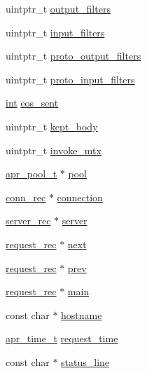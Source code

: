 \begin{DoxyCompactItemize}
\item 
uintptr\+\_\+t \hyperlink{structrequest__rec_aa02da9eb35e54fb4f12e49592414bc8e}{output\+\_\+filters}
\item 
uintptr\+\_\+t \hyperlink{structrequest__rec_ab07868ed8240b6236a51aa1e7b198d3e}{input\+\_\+filters}
\item 
uintptr\+\_\+t \hyperlink{structrequest__rec_a1031d2b213e4febecdbc04473b94d17f}{proto\+\_\+output\+\_\+filters}
\item 
uintptr\+\_\+t \hyperlink{structrequest__rec_af1d131cbf9a8564874b4196bff89121c}{proto\+\_\+input\+\_\+filters}
\item 
\hyperlink{pcre_8txt_a42dfa4ff673c82d8efe7144098fbc198}{int} \hyperlink{structrequest__rec_a0b4d967e1511b2ab93cd44987d658d43}{eos\+\_\+sent}
\item 
uintptr\+\_\+t \hyperlink{structrequest__rec_a6334659099a651e11c11716dedb79c2d}{kept\+\_\+body}
\item 
uintptr\+\_\+t \hyperlink{structrequest__rec_a788a6c1515ad8e29356808cf85b50df3}{invoke\+\_\+mtx}
\item 
\hyperlink{structapr__pool__t}{apr\+\_\+pool\+\_\+t} $\ast$ \hyperlink{structrequest__rec_a6b43edc6a8583d08944a736233838c24}{pool}
\item 
\hyperlink{structconn__rec}{conn\+\_\+rec} $\ast$ \hyperlink{structrequest__rec_a831b6bf26f59cb8c3006effc94f1ee2a}{connection}
\item 
\hyperlink{structserver__rec}{server\+\_\+rec} $\ast$ \hyperlink{structrequest__rec_adb081acb9890704af66e89d28e56e844}{server}
\item 
\hyperlink{structrequest__rec}{request\+\_\+rec} $\ast$ \hyperlink{structrequest__rec_af8eff4e5ff8cb3df48c6015841e2dd83}{next}
\item 
\hyperlink{structrequest__rec}{request\+\_\+rec} $\ast$ \hyperlink{structrequest__rec_a34f57e963ccdf850e8d70241f1a92e65}{prev}
\item 
\hyperlink{structrequest__rec}{request\+\_\+rec} $\ast$ \hyperlink{structrequest__rec_ad205770d59e047554b324393d8240758}{main}
\item 
const char $\ast$ \hyperlink{structrequest__rec_a5967124e27a5a9c0cb708aea5df1ab93}{hostname}
\item 
\hyperlink{group__apr__time_gadb4bde16055748190eae190c55aa02bb}{apr\+\_\+time\+\_\+t} \hyperlink{structrequest__rec_a6fdb123b3fa147eb2d9ec33d2f96b47f}{request\+\_\+time}
\item 
const char $\ast$ \hyperlink{structrequest__rec_ae3f3ee341cf890566e286373f997df0b}{status\+\_\+line}

\end{DoxyCompactItemize}
